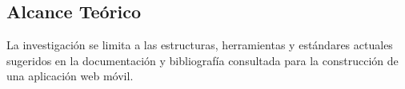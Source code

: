     \subsection{Alcance Teórico}
    \label{sub:alcance_teorico}
    La investigación se limita a las estructuras, herramientas y estándares actuales sugeridos en la documentación y bibliografía consultada para la construcción de una aplicación web móvil.










